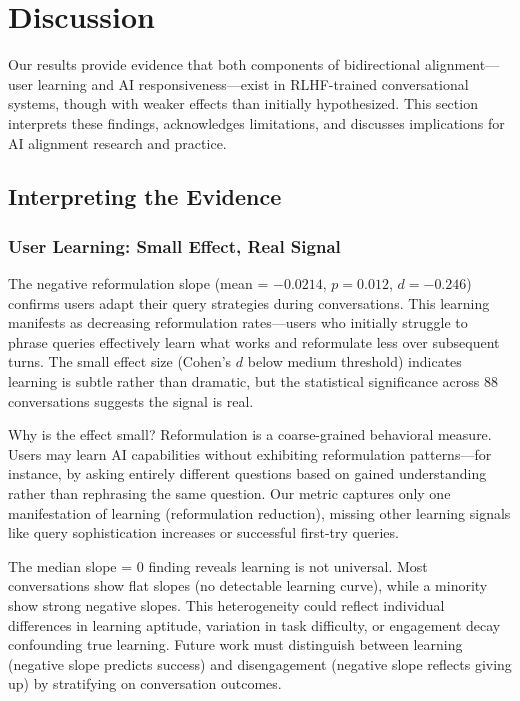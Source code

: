 \section{Discussion}
\label{sec:discussion}

Our results provide evidence that both components of bidirectional alignment---user learning and AI responsiveness---exist in RLHF-trained conversational systems, though with weaker effects than initially hypothesized. This section interprets these findings, acknowledges limitations, and discusses implications for AI alignment research and practice.

\subsection{Interpreting the Evidence}

\subsubsection{User Learning: Small Effect, Real Signal}

The negative reformulation slope (mean = $-0.0214$, $p=0.012$, $d=-0.246$) confirms users adapt their query strategies during conversations. This learning manifests as decreasing reformulation rates---users who initially struggle to phrase queries effectively learn what works and reformulate less over subsequent turns. The small effect size (Cohen's $d$ below medium threshold) indicates learning is subtle rather than dramatic, but the statistical significance across 88 conversations suggests the signal is real.

Why is the effect small? Reformulation is a coarse-grained behavioral measure. Users may learn AI capabilities without exhibiting reformulation patterns---for instance, by asking entirely different questions based on gained understanding rather than rephrasing the same question. Our metric captures only one manifestation of learning (reformulation reduction), missing other learning signals like query sophistication increases or successful first-try queries.

The median slope = 0 finding reveals learning is not universal. Most conversations show flat slopes (no detectable learning curve), while a minority show strong negative slopes. This heterogeneity could reflect individual differences in learning aptitude, variation in task difficulty, or engagement decay confounding true learning. Future work must distinguish between learning (negative slope predicts success) and disengagement (negative slope reflects giving up) by stratifying on conversation outcomes.

